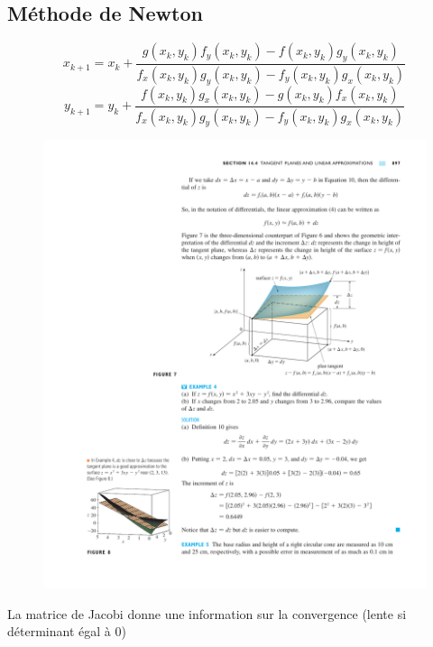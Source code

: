 \documentclass[resume]{subfiles}
\begin{document}
\subsection{Méthode de Newton}
$$\boxed{x_{k+1}=x_k+\frac{g(x_k,y_k)f_y(x_k,y_k)-f(x_k,y_k)g_y(x_k,y_k)}{f_x(x_k,y_k)g_y(x_k,y_k)-f_y(x_k,y_k)g_x(x_k,y_k)}}$$
$$\boxed{y_{k+1}=y_k+\frac{f(x_k,y_k)g_x(x_k,y_k)-g(x_k,y_k)f_x(x_k,y_k)}{f_x(x_k,y_k)g_y(x_k,y_k)-f_y(x_k,y_k)g_x(x_k,y_k)}}$$
\begin{figure}[H]
\centering
\includegraphics[width=0.8\columnwidth]{img_18.pdf}
\end{figure}
La matrice de Jacobi donne une information sur la convergence (lente si déterminant égal à 0)

    
\end{document}
